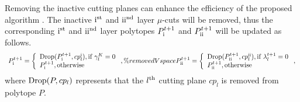 \documentclass[letterpaper]{article} %
\begin{document}
Removing the inactive cutting planes can enhance the efficiency of the proposed algorithm \cite{yang2014distributed,jiao2022distributed}. The inactive ${\rm{\uppercase\expandafter{\romannumeral1}}}^{\rm{st}}$ and ${\rm{\uppercase\expandafter{\romannumeral2}}}^{\rm{nd}}$ layer $\mu$-cuts will be removed, thus the corresponding ${\rm{\uppercase\expandafter{\romannumeral1}}}^{\rm{st}}$ and ${\rm{\uppercase\expandafter{\romannumeral2}}}^{\rm{nd}}$ layer polytopes ${P_{\rm{\uppercase\expandafter{\romannumeral1}}}^{t + 1}}$ and ${P_{\rm{\uppercase\expandafter{\romannumeral2}}}^{t + 1}}$ will be updated as follows.
\begin{equation}
\begin{array}{l}
\label{eq:inactive_inner}
{P_{\rm{\uppercase\expandafter{\romannumeral1}}}^{t + 1}} = \left\{ \begin{array}{l}
{\rm{Drop}}({P_{\rm{\uppercase\expandafter{\romannumeral1}}}^{t + 1}},c{p_l^{\rm{\uppercase\expandafter{\romannumeral1}}}}),{\rm{if}} \;\gamma_l^K=0\\
{P_{\rm{\uppercase\expandafter{\romannumeral1}}}^{t + 1}},{\rm{otherwise}}
\end{array} \right. , \%removedVspace

{P_{{\rm{\uppercase\expandafter{\romannumeral2}}}}^{t + 1}} = \left\{ \begin{array}{l}
{\rm{Drop}}({P_{{\rm{\uppercase\expandafter{\romannumeral2}}}}^{t + 1}},c{p_l^{\rm{\uppercase\expandafter{\romannumeral2}}}}),{\rm{if}} \;\lambda_l^{t+1}=0\\
{P_{{\rm{\uppercase\expandafter{\romannumeral2}}}}^{t + 1}},{\rm{otherwise}}
\end{array} \right. ,
\end{array}
\end{equation}
where ${\rm{Drop}}(P,c{p_l})$ represents that the $l^{\rm{th}}$ cutting plane $c{p_l}$ is removed from polytope $P$.
\end{document}
